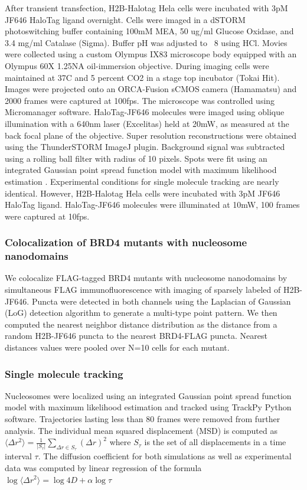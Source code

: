 After transient transfection, H2B-Halotag Hela cells were incubated with 3pM JF646 HaloTag ligand overnight. Cells were imaged in a dSTORM photoswitching buffer containing 100mM MEA, 50 ug/ml Glucose Oxidase, and 3.4 mg/ml Catalase (Sigma). Buffer pH was adjusted to ~8 using HCl. Movies were collected using a custom Olympus IX83 microscope body equipped with an Olympus 60X 1.25NA oil-immersion objective. During imaging cells were maintained at 37C and 5 percent CO2 in a stage top incubator (Tokai Hit). Images were projected onto an ORCA-Fusion sCMOS camera (Hamamatsu) and 2000 frames were captured at 100fps. The microscope was controlled using Micromanager software. HaloTag-JF646 molecules were imaged using oblique illumination with a 640nm laser (Excelitas) held at 20mW, as measured at the back focal plane of the objective. Super resolution reconstructions were obtained using the ThunderSTORM ImageJ plugin. Background signal was subtracted using a rolling ball filter with radius of 10 pixels. Spots were fit using an integrated Gaussian point spread function model with maximum likelihood estimation \parencite{Smith2010,Huang2013}. Experimental conditions for single molecule tracking are nearly identical. However, H2B-Halotag Hela cells were incubated with 3pM JF646 HaloTag ligand. HaloTag-JF646 molecules were illuminated at 10mW, 100 frames were captured at 10fps. 


\subsubsection{Colocalization of BRD4 mutants with nucleosome nanodomains}

We colocalize FLAG-tagged BRD4 mutants with nucleosome nanodomains by simultaneous FLAG immunofluorescence with imaging of sparsely labeled of H2B-JF646. Puncta were detected in both channels using the Laplacian of Gaussian (LoG) detection algorithm to generate a multi-type point pattern. We then computed the nearest neighbor distance distribution as the distance from a random H2B-JF646 puncta to the nearest BRD4-FLAG puncta. Nearest distances values were pooled over N=10 cells for each mutant. 

\subsubsection{Single molecule tracking}

Nucleosomes were localized using an integrated Gaussian point spread function model with maximum likelihood estimation \parencite{Smith2010,Huang2013} and tracked using TrackPy Python software.  Trajectories lasting less than 80 frames were removed from further analysis. The individual mean squared displacement (MSD) is computed as $\langle \Delta r^{2}\rangle = \frac{1}{\lvert S_{\tau}\lvert}\sum_{\Delta r \in S_{\tau}}(\Delta r)^{2}$
where $S_\tau$ is the set of all displacements in a time interval $\tau$. The diffusion coefficient for both simulations as well as experimental data was computed by linear regression of the formula $\log\langle \Delta r^{2}\rangle  = \log 4D + \alpha \log \tau$

